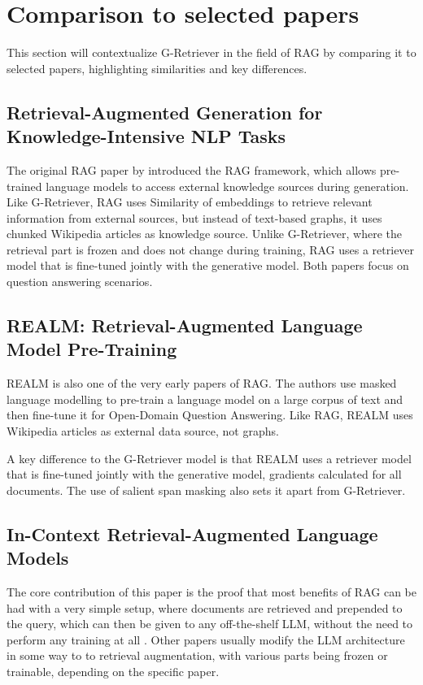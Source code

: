 \section{Comparison to selected papers}

This section will contextualize G-Retriever in the field of RAG by comparing it to selected papers, highlighting similarities and key differences.

\subsection{Retrieval-Augmented Generation for    Knowledge-Intensive NLP Tasks}

The original RAG paper by \citet{rag} introduced the RAG framework, which allows pre-trained language models to access external knowledge sources during generation.
Like G-Retriever, RAG uses Similarity of embeddings to retrieve relevant information from external sources, but instead of text-based graphs, it uses chunked Wikipedia articles as knowledge source.
Unlike G-Retriever, where the retrieval part is frozen and does not change during training, RAG uses a retriever model that is fine-tuned jointly with the generative model.
Both papers focus on question answering scenarios.

\subsection{REALM: Retrieval-Augmented Language Model Pre-Training}

REALM \cite{realm} is also one of the very early papers of RAG.
The authors use masked language modelling to pre-train a language model on a large corpus of text and then fine-tune it for Open-Domain Question Answering.
Like RAG, REALM uses Wikipedia articles as external data source, not graphs.

A key difference to the G-Retriever model is that REALM uses a retriever model that is fine-tuned jointly with the generative model, gradients calculated for all documents.
The use of salient span masking also sets it apart from G-Retriever.

\subsection{In-Context Retrieval-Augmented Language Models}

The core contribution of this paper is the proof that most benefits of RAG can be had with a very simple setup, where documents are retrieved and prepended to the query, which can then be given to any off-the-shelf LLM, without the need to perform any training at all \cite{in-context}.
Other papers usually modify the LLM architecture in some way to to retrieval augmentation, with various parts being frozen or trainable, depending on the specific paper.


